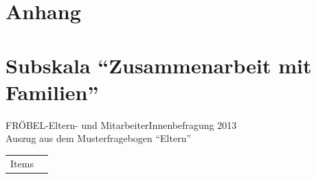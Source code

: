 \documentclass[12pt,a4paper]{article}
\begin{document}
\begin{appendix}
\section*{Anhang}






\section{Subskala "`Zusammenarbeit mit Familien"'}
FRÖBEL-Eltern- und MitarbeiterInnenbefragung 2013\\
Auszug aus dem Musterfragebogen "`Eltern"'
\begin{table}[h]

\begin{tabularx}{\textwidth}{rX}
\hline 
Items&
 

\end{tabularx}
\end{table}
\end{appendix}
\end{document}
